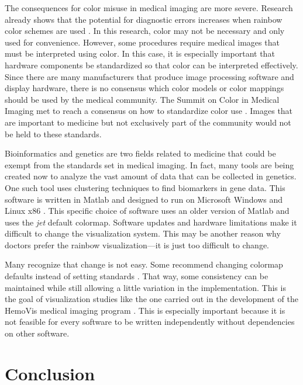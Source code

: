 \documentclass[journal,12pt]{IEEEtran}
\begin{document}
The consequences for color misuse in medical imaging are more severe. Research
already shows that the potential for diagnostic errors increases when 
rainbow color schemes are used \cite{arteryvis}. In this research, color may not
be necessary and only used for convenience. However, some procedures require 
medical images that must be interpreted using color. In this case, it
is especially important that hardware components be standardized so that color
can be interpreted effectively. Since there are many manufacturers that produce
image processing software and display hardware, there is no consensus which 
color models or color mappings should be used by the medical community.
The Summit on Color in Medical Imaging
met to reach a consensus on how to standardize color use 
\cite{standardmedimg}. Images that are important to medicine but not exclusively
part of the community would not be held to these standards.

Bioinformatics and genetics are two fields related to medicine that 
could be exempt from the standards set in medical imaging. In fact, many tools
are being created now to analyze the vast amount of data that can be collected
in genetics. One such tool uses clustering techniques to find biomarkers in 
gene data. This software is written in Matlab and designed to run on Microsoft
Windows and Linux x86 \cite{marvis}. This specific choice of software uses an
older version of Matlab and uses the \textit{jet} default colormap. 
Software updates and hardware limitations make it difficult to change 
the visualization system. This may be another reason why doctors prefer
the rainbow visualization---it is just too difficult to change.

Many recognize that change is not easy. Some recommend changing 
colormap defaults instead of setting standards \cite{viridis}. That way, some 
consistency can be maintained while still allowing a little variation in the
implementation. This is the goal of visualization studies like the one 
carried out in the development of the HemoVis medical imaging program 
\cite{arteryvis}. This is especially important because it is not feasible for
every software to be written independently without dependencies on other
software.

\section{Conclusion}
\end{document}

